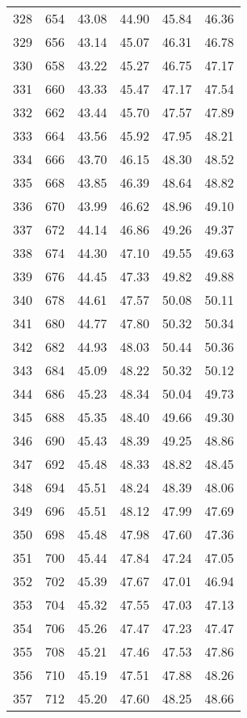 \begin{longtable}{rrllll}
		328 & 654 & 43.08 & 44.90 & 45.84 & 46.36 \\ 
		329 & 656 & 43.14 & 45.07 & 46.31 & 46.78 \\ 
		330 & 658 & 43.22 & 45.27 & 46.75 & 47.17 \\ 
		331 & 660 & 43.33 & 45.47 & 47.17 & 47.54 \\ 
		332 & 662 & 43.44 & 45.70 & 47.57 & 47.89 \\ 
		333 & 664 & 43.56 & 45.92 & 47.95 & 48.21 \\ 
		334 & 666 & 43.70 & 46.15 & 48.30 & 48.52 \\ 
		335 & 668 & 43.85 & 46.39 & 48.64 & 48.82 \\ 
		336 & 670 & 43.99 & 46.62 & 48.96 & 49.10 \\ 
		337 & 672 & 44.14 & 46.86 & 49.26 & 49.37 \\ 
		338 & 674 & 44.30 & 47.10 & 49.55 & 49.63 \\ 
		339 & 676 & 44.45 & 47.33 & 49.82 & 49.88 \\ 
		340 & 678 & 44.61 & 47.57 & 50.08 & 50.11 \\ 
		341 & 680 & 44.77 & 47.80 & 50.32 & 50.34 \\ 
		342 & 682 & 44.93 & 48.03 & 50.44 & 50.36 \\ 
		343 & 684 & 45.09 & 48.22 & 50.32 & 50.12 \\ 
		344 & 686 & 45.23 & 48.34 & 50.04 & 49.73 \\ 
		345 & 688 & 45.35 & 48.40 & 49.66 & 49.30 \\ 
		346 & 690 & 45.43 & 48.39 & 49.25 & 48.86 \\ 
		347 & 692 & 45.48 & 48.33 & 48.82 & 48.45 \\ 
		348 & 694 & 45.51 & 48.24 & 48.39 & 48.06 \\ 
		349 & 696 & 45.51 & 48.12 & 47.99 & 47.69 \\ 
		350 & 698 & 45.48 & 47.98 & 47.60 & 47.36 \\ 
		351 & 700 & 45.44 & 47.84 & 47.24 & 47.05 \\ 
		352 & 702 & 45.39 & 47.67 & 47.01 & 46.94 \\ 
		353 & 704 & 45.32 & 47.55 & 47.03 & 47.13 \\ 
		354 & 706 & 45.26 & 47.47 & 47.23 & 47.47 \\ 
		355 & 708 & 45.21 & 47.46 & 47.53 & 47.86 \\ 
		356 & 710 & 45.19 & 47.51 & 47.88 & 48.26 \\ 
		357 & 712 & 45.20 & 47.60 & 48.25 & 48.66 \\ 

\end{longtable}
